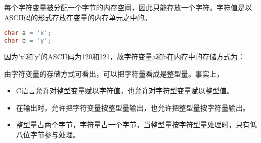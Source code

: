 \begin{frame}[fragile]

每个字符变量被分配一个字节的内存空间，因此只能存放一个字符。字符值是以ASCII码的形式存放在变量的内存单元之中的。

\end{frame}

\begin{frame}[fragile]
\begin{lstlisting}[language=C]
char a = 'x';    
char b = 'y'; 
\end{lstlisting}
因为'x'和'y'的ASCII码为120和121，故字符变量a和b在内存中的存储方式为：
\begin{figure}
\centering
{}
\end{figure}
\end{frame}

\begin{frame}[fragile]
由字符变量的存储方式可看出，可以把字符量看成是整型量。事实上，\vspace{0.05in}

\begin{itemize}
\item 
C语言允许对整型变量赋以字符值，也允许对字符型变量赋以整型值。\\[0.1in]
\item 
在输出时，允许把字符变量按整型量输出，也允许把整型量按字符量输出。
\\[0.1in]
\item 
整型量占两个字节，字符量占一个字节，当整型量按字符型量处理时，只有低八位字节参与处理。
\end{itemize}
\end{frame}

